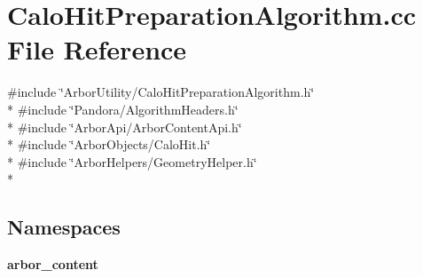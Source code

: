 \section{Calo\+Hit\+Preparation\+Algorithm.\+cc File Reference}
\label{CaloHitPreparationAlgorithm_8cc}
{\ttfamily \#include \char`\"{}Arbor\+Utility/\+Calo\+Hit\+Preparation\+Algorithm.\+h\char`\"{}}\\*
{\ttfamily \#include \char`\"{}Pandora/\+Algorithm\+Headers.\+h\char`\"{}}\\*
{\ttfamily \#include \char`\"{}Arbor\+Api/\+Arbor\+Content\+Api.\+h\char`\"{}}\\*
{\ttfamily \#include \char`\"{}Arbor\+Objects/\+Calo\+Hit.\+h\char`\"{}}\\*
{\ttfamily \#include \char`\"{}Arbor\+Helpers/\+Geometry\+Helper.\+h\char`\"{}}\\*
\subsection*{Namespaces}
\begin{DoxyCompactItemize}
\item 
 {\bf arbor\+\_\+content}
\end{DoxyCompactItemize}
